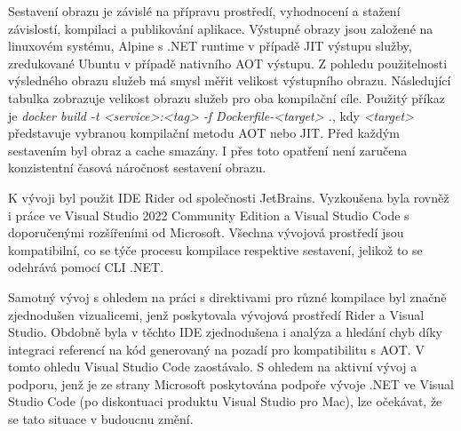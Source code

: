 Sestavení obrazu je závislé na přípravu prostředí, vyhodnocení a stažení závislostí, kompilaci a publikování aplikace. Výstupné obrazy jsou založené na linuxovém systému, Alpine s .NET runtime v případě JIT výstupu služby, zredukované Ubuntu v případě nativního AOT výstupu. Z pohledu použitelnosti výsledného obrazu služeb má smysl měřit velikost výstupního obrazu. Následující tabulka zobrazuje velikost obrazu služeb pro oba kompilační cíle. Použitý příkaz je \emph{docker build -t <service>:<tag> -f Dockerfile-<target> .}, kdy \emph{<target>} představuje vybranou kompilační metodu AOT nebo JIT. Před každým sestavením byl obraz a cache smazány. I přes toto opatření není zaručena konzistentní časová náročnost sestavení obrazu.



K vývoji byl použit IDE Rider od společnosti JetBrains. Vyzkoušena byla rovněž i práce ve Visual Studio 2022 Community Edition a Visual Studio Code s doporučenými rozšířeními od Microsoft. Všechna vývojová prostředí jsou kompatibilní, co se týče procesu kompilace respektive sestavení, jelikož to se odehrává pomocí CLI .NET.

Samotný vývoj s ohledem na práci s direktivami pro různé kompilace byl značně zjednodušen vizualicemi, jenž poskytovala vývojová prostředí Rider a Visual Studio. Obdobně byla v těchto IDE zjednodušena i analýza a hledání chyb díky integraci referencí na kód generovaný na pozadí pro kompatibilitu s AOT. V tomto ohledu Visual Studio Code zaostávalo. S ohledem na aktivní vývoj a podporu, jenž je ze strany Microsoft poskytována podpoře vývoje .NET ve Visual Studio Code (po diskontuaci produktu Visual Studio pro Mac), lze očekávat, že se tato situace v budoucnu změní.



